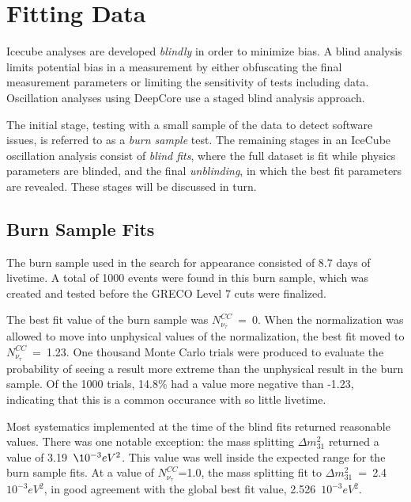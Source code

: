 \graphicspath{{chapters/analysis/images/}}
\label{sec:fitting_data}
\section{Fitting Data}
Icecube analyses are developed \emph{blindly} in order to minimize bias.
A blind analysis limits potential bias in a measurement by either obfuscating the final measurement parameters or limiting the sensitivity of tests including data.
Oscillation analyses using DeepCore use a staged blind analysis approach.

The initial stage, testing with a small sample of the data to detect software issues, is referred to as a \emph{burn sample} test.
The remaining stages in an IceCube oscillation analysis consist of \emph{blind fits}, where the full dataset is fit while physics parameters are blinded, and the final \emph{unblinding}, in which the best fit parameters are revealed.
These stages will be discussed in turn.

\label{subsec:burn_sample}
\subsection{Burn Sample Fits}
The burn sample used in the search for appearance consisted of 8.7 days of livetime.
A total of 1000 events were found in this burn sample, which was created and tested before the GRECO Level 7 cuts were finalized.

The best fit value of the burn sample was $N^{CC}_{\nu_\tau}$~=~0.
When the normalization was allowed to move into unphysical values of the normalization, the best fit moved to $N^{CC}_{\nu_\tau}$~=~1.23.
One thousand Monte Carlo trials were produced to evaluate the probability of seeing a result more extreme than the unphysical result in the burn sample.
Of the 1000 trials, 14.8\% had a value more negative than -1.23, indicating that this is a common occurance with so little livetime.

Most systematics implemented at the time of the blind fits returned reasonable values.
There was one notable exception: the mass splitting $\Delta m^2_{31}$ returned a value of 3.19~$\10^{-3} eV^2$. 
This value was well inside the expected range for the burn sample fits.
At a value of  $N^{CC}_{\nu_\tau}$=1.0, the mass splitting fit to $\Delta m^2_{31}$~=~2.4~$10^{-3} eV^2$, in good agreement with the global best fit value, 2.526~$10^{-3} eV^2$.





